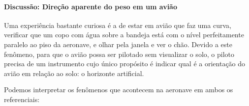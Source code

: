 \paragraph{Discussão: Direção aparente do peso em um avião}

Uma experiência bastante curiosa é a de estar em avião que faz uma curva, verificar que um copo com água sobre a bandeja está com o nível perfeitamente paralelo ao piso da aeronave, e olhar pela janela e ver o chão. Devido a este fenômeno, para que o avião possa ser pilotado sem visualizar o solo, o piloto precisa de um instrumento cujo único propósito é indicar qual é a orientação do avião em relação ao solo: o horizonte artificial.

Podemos interpretar os fenômenos que acontecem na aeronave em ambos os referenciais:
